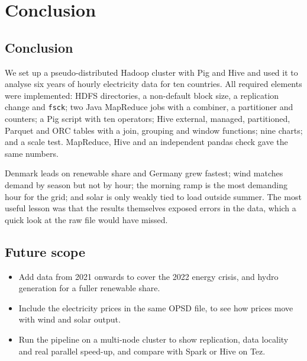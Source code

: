 \documentclass[12pt,a4paper]{report}
\begin{document}
\chapter{Conclusion}\label{ch:concl}

\section{Conclusion}
We set up a pseudo-distributed Hadoop cluster with Pig and Hive and used it to analyse six years of hourly electricity data for ten countries. All required elements were implemented: HDFS directories, a non-default block size, a replication change and \texttt{fsck}; two Java MapReduce jobs with a combiner, a partitioner and counters; a Pig script with ten operators; Hive external, managed, partitioned, Parquet and ORC tables with a join, grouping and window functions; nine charts; and a scale test. MapReduce, Hive and an independent pandas check gave the same numbers.

Denmark leads on renewable share and Germany grew fastest; wind matches demand by season but not by hour; the morning ramp is the most demanding hour for the grid; and solar is only weakly tied to load outside summer. The most useful lesson was that the results themselves exposed errors in the data, which a quick look at the raw file would have missed.

\section{Future scope}
\begin{itemize}
\item Add data from 2021 onwards to cover the 2022 energy crisis, and hydro generation for a fuller renewable share.
\item Include the electricity prices in the same OPSD file, to see how prices move with wind and solar output.
\item Run the pipeline on a multi-node cluster to show replication, data locality and real parallel speed-up, and compare with Spark or Hive on Tez.
\end{itemize}
\end{document}
